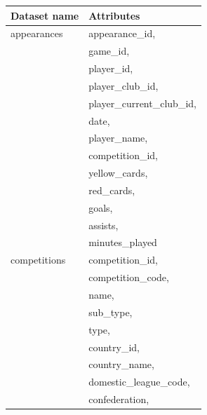 \documentclass{Configuration_Files/PoliMi3i_thesis}
\begin{document}
\begin{tabular}{|l|p{13cm}|}
	\hline
	\textbf{Dataset name} & \textbf{Attributes}                       \\
	\hline
appearances
	                      & appearance\_id,                           \\
	                      & game\_id,                                 \\
	                      & player\_id,                               \\
	                      & player\_club\_id,                         \\
	                      & player\_current\_club\_id,                \\
	                      & date,                                     \\
	                      & player\_name,                             \\
	                      & competition\_id,                          \\
	                      & yellow\_cards,                            \\
	                      & red\_cards,                               \\
	                      & goals,                                    \\
	                      & assists,                                  \\
	                      & minutes\_played                           \\
	\hline
	competitions
	                      & competition\_id,                          \\
	                      & competition\_code,                        \\
	                      & name,                                     \\
	                      & sub\_type,                                \\
	                      & type,                                     \\
	                      & country\_id,                              \\
	                      & country\_name,                            \\
	                      & domestic\_league\_code,                   \\
	                      & confederation,                            \\

\end{tabular}
\end{document}
